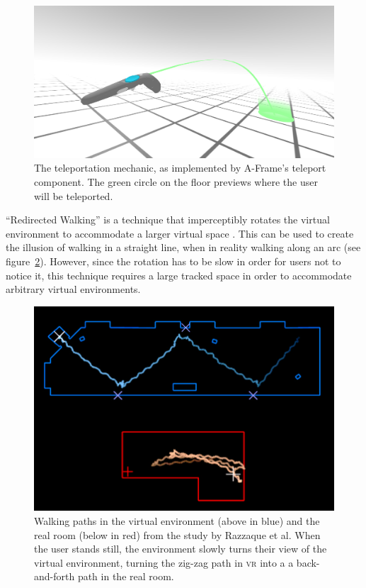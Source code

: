 \documentclass[nobib]{tufte-book} %
\begin{document}
\begin{figure}
  \includegraphics{teleport.png}
  \caption{The teleportation mechanic, as implemented by A-Frame's teleport component. The green circle on the floor previews where the user will be teleported.}
  \label{fig:teleport}
\end{figure}

\newpage

``Redirected Walking'' is a technique that imperceptibly rotates the virtual environment to accommodate a larger virtual space \cite{razzaque2001redirected}. This can be used to create the illusion of walking in a straight line, when in reality walking along an arc (see figure~\ref{fig:redirected}). However, since the rotation has to be slow in order for users not to notice it, this technique requires a large tracked space in order to accommodate arbitrary virtual environments.

\begin{figure}
  \includegraphics{redirected.png}
  \caption{Walking paths in the virtual environment (above in blue) and the real room (below in red) from the study by Razzaque et al. When the user stands still, the environment slowly turns their view of the virtual environment, turning the zig-zag path in \textsc{vr} into a a back-and-forth path in the real room.}
  \label{fig:redirected}
\end{figure}
\end{document}
